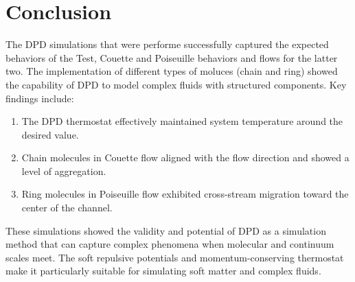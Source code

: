 \section*{Conclusion}
The DPD simulations that were performe successfully captured the expected behaviors of the Test, Couette and Poiseuille behaviors and flows for the latter two. The implementation of different types of moluces (chain and ring) showed the capability of DPD to model complex fluids with structured components.
Key findings include:
\begin{enumerate}
	\item The DPD thermostat effectively maintained system temperature around the desired value.
	\item Chain molecules in Couette flow aligned with the flow direction and showed a level of aggregation.
	\item Ring molecules in Poiseuille flow exhibited cross-stream migration toward the center of the channel. 
\end{enumerate}
These simulations showed the validity and potential of DPD as a simulation method that can capture complex phenomena  when molecular and continuum scales meet. The soft repulsive potentials and momentum-conserving thermostat make it particularly suitable for simulating soft matter and complex fluids.
